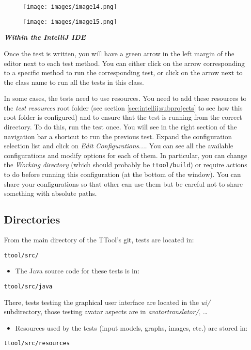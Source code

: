 \documentclass[12pt]{article}
\begin{document}
\begin{figure}[H]
\begin{center}
\texttt{[image: images/image14.png]}
\end{center}
\caption{}
\label{fig:image13}
\end{figure}

\begin{figure}[H]
\begin{center}
\texttt{[image: images/image15.png]}
\end{center}
\caption{}
\label{fig:image14}
\end{figure}

\textbf{\emph{Within the IntelliJ IDE}}

Once the
test is written, you will have a green arrow in the left margin of the editor
next to each test method. You can either click on the arrow corresponding to a
specific method to run the corresponding test, or click on the arrow next to the
class name to run all the tests in this class.

In some cases, the tests need to use resources. You need to add these resources
to the \emph{test resources} root folder (see section
\ref{sec:intellij:subprojects} to see how this root folder is configured) and
to ensure that the test is running from the correct directory. To do this, run
the test once. You will see in the right section of the navigation bar a
shortcut to run the previous test. Expand the configuration selection list and
click on \emph{Edit Configurations...}. You can see all the available
configurations and modify options for each of them. In particular, you can
change the \emph{Working directory} (which should probably be
\texttt{ttool/build}) or require actions to do before running this
configuration (at the bottom of the window). You can share your configurations
so that other can use them but be careful not to share something with absolute
paths.


\subsection{Directories}

From the main directory of the TTool's git, tests are located in:
\begin{verbatim}
ttool/src/
\end{verbatim}
\begin{itemize}
\item The Java source code for these tests is in:
\end{itemize}
\begin{verbatim}
ttool/src/java
\end{verbatim}
There, tests testing the graphical user interface are located in the \textit{ui/} subdirectory, those testing avatar aspects are in \textit{avatartranslator/}, \ldots
\begin{itemize}
\item Resources used by the tests (input models, graphs, images, etc.) are stored in:
\end{itemize}
\begin{verbatim}
ttool/src/resources
\end{verbatim}
\end{document}
